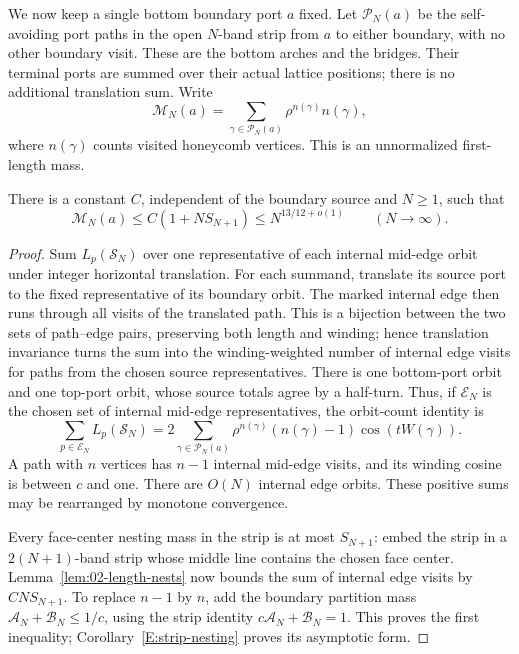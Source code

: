 We now keep a single bottom boundary port \(a\) fixed. Let
\(\mathcal P_N(a)\) be the self-avoiding port paths in the open
\(N\)-band strip from \(a\) to either boundary, with no other boundary
visit. These are the bottom arches and the bridges. Their terminal
ports are summed over their actual lattice positions; there is no
additional translation sum. Write
\[
 \mathcal M_N(a)=\sum_{\gamma\in\mathcal P_N(a)}
                  \rho^{n(\gamma)}n(\gamma),
\]
where \(n(\gamma)\) counts visited honeycomb vertices. This is an
unnormalized first-length mass.

\begin{proposition}\label{E:raw-first-moment}
There is a constant \(C\), independent of the boundary source and
\(N\ge1\), such that
\begin{equation}
 \mathcal M_N(a)\le C(1+NS_{N+1})
                      \le N^{13/12+o(1)}
 \qquad(N\longrightarrow\infty).
 \label{eq:05-raw-first-moment}
\end{equation}
\end{proposition}
\begin{proof}
Sum \(L_p(\mathcal S_N)\) over one representative of each internal
mid-edge orbit under integer horizontal translation. For each summand, translate its source port to the fixed representative
of its boundary orbit. The marked internal edge then runs through all
visits of the translated path. This is a bijection between the two sets
of path--edge pairs, preserving both length and winding; hence translation
invariance turns the sum into the winding-weighted number of internal
edge visits for paths from the chosen source representatives.
There is one bottom-port orbit and one top-port orbit, whose source
totals agree by a half-turn. Thus, if \(\mathcal E_N\) is the chosen
set of internal mid-edge representatives, the orbit-count identity is
\[
 \sum_{p\in\mathcal E_N}L_p(\mathcal S_N)
 =2\sum_{\gamma\in\mathcal P_N(a)}
       \rho^{n(\gamma)}(n(\gamma)-1)\cos(tW(\gamma)).
\]
A path with \(n\) vertices has \(n-1\) internal mid-edge visits, and
its winding cosine is between \(c\) and one. There are \(O(N)\)
internal edge orbits. These positive sums may be rearranged by monotone
convergence.

Every face-center nesting mass in the strip is at most \(S_{N+1}\):
embed the strip in a \(2(N+1)\)-band strip whose middle line contains
the chosen face center. Lemma~\ref{lem:02-length-nests} now bounds the
sum of internal edge visits by \(CNS_{N+1}\). To replace \(n-1\) by
\(n\), add the boundary partition mass
\(\mathcal A_N+\mathcal B_N\le 1/c\), using the strip identity
\(c\mathcal A_N+\mathcal B_N=1\). This proves the first inequality;
Corollary~\ref{E:strip-nesting} proves its asymptotic form.
\end{proof}

